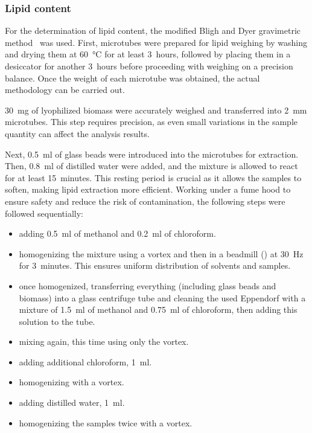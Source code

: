 \subsubsection{Lipid content}
For the determination of lipid content, the modified Bligh and Dyer gravimetric method~\parencite{bligh_RAPID_1959} was used. First, microtubes were prepared for lipid weighing by washing and drying them at \qty{60}{\degreeCelsius} for at least \qty{3}{hours}, followed by placing them in a desiccator for another \qty{3}{hours} before proceeding with weighing on a precision balance. Once the weight of each microtube was obtained, the actual methodology can be carried out.

\zariv{} \qty{30}{\milli\gram} of lyophilized biomass were accurately weighed and transferred into \qty{2}{\milli\metre} microtubes. This step requires precision, as even small variations in the sample quantity can affect the analysis results.

Next, \qty{0.5}{\milli\litre} of glass beads were introduced into the microtubes for extraction. Then, \qty{0.8}{\milli\litre} of distilled water were added, and the mixture is allowed to react for at least \qty{15}{minutes}. This resting period is crucial as it allows the samples to soften, making lipid extraction more efficient. Working under a fume hood to ensure safety and reduce the risk of contamination, the following steps were followed sequentially:
\begin{itemize}
\item adding \qty{0,5}{\milli\litre} of methanol and \qty{0,2}{\milli\litre} of chloroform.
\item homogenizing the mixture using a vortex and then in a beadmill () at \qty{30}{\hertz} for \qty{3}{minutes}. This ensures uniform distribution of solvents and samples.
\item once homogenized, transferring everything (including glass beads and biomass) into a glass centrifuge tube and cleaning the used Eppendorf with a mixture of \qty{1,5}{\milli\litre} of methanol and \qty{0,75}{\milli\litre} of chloroform, then adding this solution to the tube.
\item mixing again, this time using only the vortex.
\item adding additional chloroform, \qty{1}{\milli\litre}.
\item homogenizing with a vortex.
\item adding distilled water, \qty{1}{\milli\litre}.
\item homogenizing the samples twice with a vortex.
\end{itemize}

